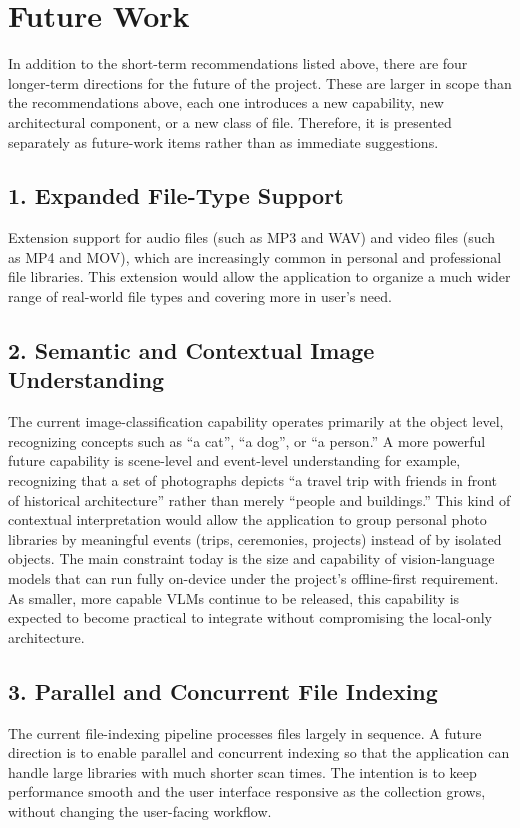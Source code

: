 \documentclass[12pt,oneside,openright,a4paper]{cpe-english-project}
\begin{document}
\section{Future Work}
In addition to the short-term recommendations listed above, there are four longer-term directions for the future of the project. These are larger in scope than the recommendations above, each one introduces a new capability, new architectural component, or a new class of file. Therefore, it is presented separately as future-work items rather than as immediate suggestions.

\subsection*{1. Expanded File-Type Support}
Extension support for audio files (such as MP3 and WAV) and video files (such as MP4 and MOV), which are increasingly common in personal and professional file libraries. This extension would allow the application to organize a much wider range of real-world file types and covering more in user's need.

\subsection*{2. Semantic and Contextual Image Understanding}
The current image-classification capability operates primarily at the object level, recognizing concepts such as ``a cat'', ``a dog'', or ``a person.'' A more powerful future capability is scene-level and event-level understanding for example, recognizing that a set of photographs depicts ``a travel trip with friends in front of historical architecture'' rather than merely ``people and buildings.'' This kind of contextual interpretation would allow the application to group personal photo libraries by meaningful events (trips, ceremonies, projects) instead of by isolated objects. The main constraint today is the size and capability of vision-language models that can run fully on-device under the project's offline-first requirement. As smaller, more capable VLMs continue to be released, this capability is expected to become practical to integrate without compromising the local-only architecture.

\subsection*{3. Parallel and Concurrent File Indexing}
The current file-indexing pipeline processes files largely in sequence. A future direction is to enable parallel and concurrent indexing so that the application can handle large libraries with much shorter scan times. The intention is to keep performance smooth and the user interface responsive as the collection grows, without changing the user-facing workflow.
\end{document}
